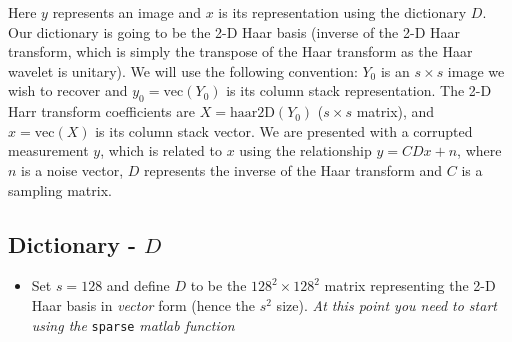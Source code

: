 \documentclass[]{article}
\begin{document}
Here $y$ represents an image and $x$ is its representation using the dictionary $D$. Our dictionary is going to be the 2-D  Haar basis (inverse of the 2-D Haar transform, which is simply the transpose of the Haar transform as the Haar wavelet is unitary). 
We will use the following convention: $Y_0$ is an $s\times s$ image we wish to recover and $y_0=\text{vec}(Y_0)$ is its column stack representation. The 2-D Harr transform coefficients are $X = \text{haar2D}(Y_0)$ ($s\times s$ matrix), and $x=\text{vec}(X)$ is its column stack vector. We are presented with a corrupted measurement $y$, which is related to $x$ using the relationship $y=CDx+n$, where $n$ is a noise vector, $D$ represents the inverse of the Haar transform and $C$ is a sampling matrix.  

\subsection{Dictionary - $D$ }
\begin{itemize}
	\item Set $s=128$ and define $D$ to be the $128^2\times 128^2$ matrix representing the 2-D Haar basis in \emph{vector} form (hence the $s^2$ size). \emph{At this point you need to start using the} \lstinline|sparse| \emph{matlab function}   
	
	
\end{itemize} 
\end{document}
